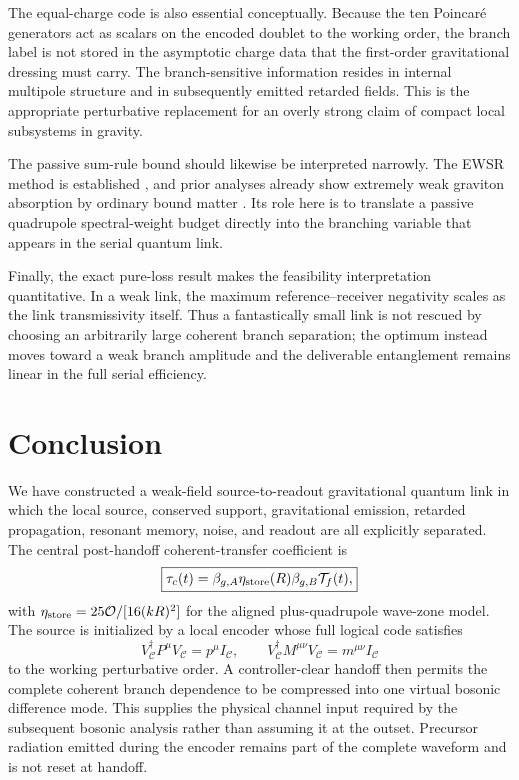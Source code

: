 The equal-charge code is also essential conceptually. Because the ten Poincar\'e generators act as scalars on the encoded doublet to the working order, the branch label is not stored in the asymptotic charge data that the first-order gravitational dressing must carry. The branch-sensitive information resides in internal multipole structure and in subsequently emitted retarded fields. This is the appropriate perturbative replacement for an overly strong claim of compact local subsystems in gravity.

The passive sum-rule bound should likewise be interpreted narrowly. The EWSR method is established \cite{LuJohnson2018,Hinohara2019}, and prior analyses already show extremely weak graviton absorption by ordinary bound matter \cite{BoughnRothman2006,PalessandroSloth2020}. Its role here is to translate a passive quadrupole spectral-weight budget directly into the branching variable that appears in the serial quantum link.

Finally, the exact pure-loss result makes the feasibility interpretation quantitative. In a weak link, the maximum reference--receiver negativity scales as the link transmissivity itself. Thus a fantastically small link is not rescued by choosing an arbitrarily large coherent branch separation; the optimum instead moves toward a weak branch amplitude and the deliverable entanglement remains linear in the full serial efficiency.

\section{Conclusion}

We have constructed a weak-field source-to-readout gravitational quantum link in which the local source, conserved support, gravitational emission, retarded propagation, resonant memory, noise, and readout are all explicitly separated. The central post-handoff coherent-transfer coefficient is
\begin{equation}
\boxed{
\tau_c(t)=
\beta_{g,A}\eta_{\rm store}(R)\beta_{g,B}\mathcal T_f(t),}
\end{equation}
with $\eta_{\rm store}=25\mathcal O/[16(kR)^2]$ for the aligned plus-quadrupole wave-zone model. The source is initialized by a local encoder whose full logical code satisfies
\begin{equation}
V_{\mathcal C}^\dagger P^\mu V_{\mathcal C}=p^\mu I_{\mathcal C},
\qquad
V_{\mathcal C}^\dagger M^{\mu\nu}V_{\mathcal C}=m^{\mu\nu}I_{\mathcal C}
\end{equation}
to the working perturbative order. A controller-clear handoff then permits the complete coherent branch dependence to be compressed into one virtual bosonic difference mode. This supplies the physical channel input required by the subsequent bosonic analysis rather than assuming it at the outset. Precursor radiation emitted during the encoder remains part of the complete waveform and is not reset at handoff.

